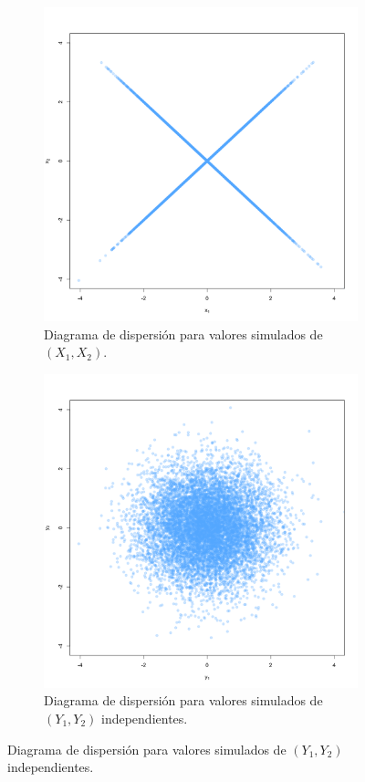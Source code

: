 \documentclass[11pt,a4paper]{article}
\begin{document}
\begin{figure}[h]
    \centering
    \begin{subfigure}[t]{0.45\textwidth}
        \centering
        \includegraphics[width=\linewidth]{correlation.png} 
        \caption{Diagrama de dispersión para valores simulados de $(X_1, X_2)$.} \label{fig:corr1}
    \end{subfigure}
    \hfill
    \begin{subfigure}[t]{0.45\textwidth}
        \centering
        \includegraphics[width=\linewidth]{correlation_ind.png} 
        \caption{Diagrama de dispersión para valores simulados de $(Y_1, Y_2)$ independientes.} \label{fig:corr2}
    \end{subfigure}
    

\end{figure}
\end{document}
